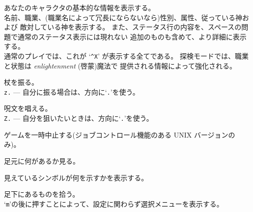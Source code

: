 あなたのキャラクタの基本的な情報を表示する。\\
名前、職業、(職業名によって冗長にならないなら)性別、属性、従っている神および
敵対している神を表示する。
また、ステータス行の内容を、スペースの問題で通常のステータス表示には現れない
追加のものも含めて、より詳細に表示する。\\
通常のプレイでは、これが `{\tt \^{}X}' が表示する全てである。
探検モードでは、職業と状態は {\it enlightenment\/} (啓蒙)魔法で
提供される情報によって強化される。
\item[\tb{z}]
杖を振る。\\
{\tt z.} --- 自分に振る場合は、方向に`{\tt .}'を使う。
\item[\tb{Z}]
呪文を唱える。\\
{\tt Z.} --- 自分を狙いたいときは、方向に`{\tt .}'を使う。
\item[\tb{\^{}Z}]
ゲームを一時中止する(ジョブコントロール機能のある UNIX バージョンのみ)。
\item[\tb{:}]
足元に何があるか見る。
\item[\tb{;}]
見えているシンボルが何を示すかを表示する。
\item[\tb{,}]
足下にあるものを拾う。\\
`{\tt m}'の後に押すことによって、設定に関わらず選択メニューを表示する。

